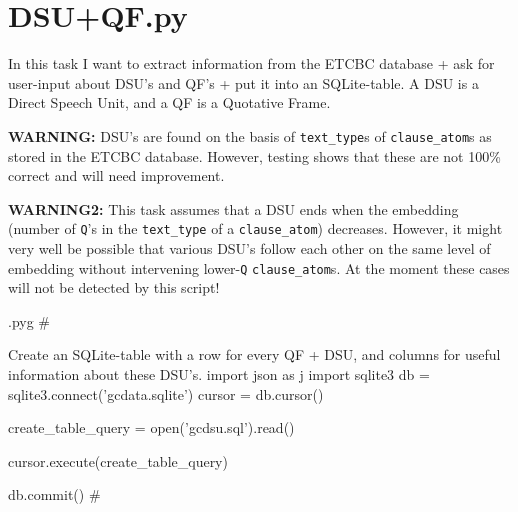 \documentclass{report}
\makeatletter
\newcommand{\mi}[1]{\lstinline{#1}}
\newenvironment{python}{%
  \VerbatimEnvironment
  \minted@resetoptions
  \setkeys{minted@opt}{}
      \begin{VerbatimOut}{\jobname.pyg}}
{%
      \end{VerbatimOut}
      \minted@pygmentize{python}
      \DeleteFile{\jobname.pyg}}
\makeatother
\begin{document}
\chapter{DSU+QF.py}
\lstset{language=python,basicstyle=\ttfamily}

\begin{multicols}{2}
In this task I want to extract information from the ETCBC database + ask for user-input about DSU's and QF's + put it into an SQLite-table.
A DSU is a Direct Speech Unit, and a QF is a Quotative Frame.

\textbf{WARNING:} DSU's are found on the basis of \mi{text_type}s of \mi{clause_atom}s as stored in the ETCBC database. However, testing shows that these are not 100\% correct and will need improvement.

\textbf{WARNING2:} This task assumes that a DSU ends when the embedding (number of \mi{Q}'s in the \mi{text_type} of a \mi{clause_atom}) decreases.
However, it might very well be possible that various DSU's follow each other on the same level of embedding without intervening lower-\mi{Q} \mi{clause_atom}s.
At the moment these cases will not be detected by this script!
\end{multicols}

\begin{python}
#{{{ Create an SQLite-table with a row for every QF + DSU, and columns for useful information about these DSU's.
import json as j
import sqlite3
db = sqlite3.connect('gcdata.sqlite')
cursor = db.cursor()

create_table_query = open('gcdsu.sql').read()

cursor.execute(create_table_query)

db.commit()
#}}}
\end{python}
\end{document}
